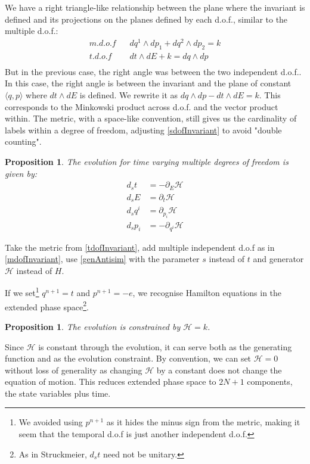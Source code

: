 \documentclass[aps,pra,10pt,twocolumn,floatfix,nofootinbib]{revtex4-1}
\newtheorem{prop}[thm]{Proposition}
\theoremstyle{definition}
\begin{document}
We have a right triangle-like relationship between the plane where the invariant is defined and its projections on the planes defined by each d.o.f., similar to the multiple d.o.f.:
\begin{align*}
m.d.o.f \;\;\; &dq^1 \wedge dp_1 + dq^2 \wedge dp_2 = k \\
t.d.o.f \;\;\; &dt \wedge dE + k = dq \wedge dp \\
\end{align*}
But in the previous case, the right angle was between the two independent d.o.f.. In this case, the right angle is between the invariant and the plane of constant $\langle q, p \rangle$ where $dt \wedge dE$ is defined. We rewrite it as $dq \wedge dp - dt \wedge dE = k$. This corresponds to the Minkowski product across d.o.f. and the vector product within. The metric, with a space-like convention, still gives us the cardinality of labels within a degree of freedom, adjusting \ref{sdofInvariant} to avoid "double counting".

\begin{prop}\label{tdofHam}
The evolution for time varying multiple degrees of freedom is given by:
\begin{align*}
d_{s}t &= - \partial_{E} \mathcal{H} \\
d_{s}E &= \partial_{t} \mathcal{H} \\
d_{s}q^i &= \partial_{p_i} \mathcal{H} \\
d_{s}p_i &= - \partial_{q^i} \mathcal{H}
\end{align*}
\end{prop}

Take the metric from \ref{tdofInvariant}, add multiple independent d.o.f as in \ref{mdofInvariant}, use \ref{genAntisim} with the parameter $s$ instead of $t$ and generator $\mathcal{H}$ instead of $H$.

If we set\footnote{We avoided using $p^{n+1}$ as it hides the minus sign from the metric, making it seem that the temporal d.o.f is just another independent d.o.f.} $q^{n+1}=t$ and $p^{n+1}=-e$, we recognise Hamilton equations in the extended phase space\footnote{As in Struckmeier\cite{Struckmeier}, $d_{s}t$ need not be unitary.}\cite{Synge,Lanczos}.

\begin{prop}\label{tdofConstrain}
The evolution is constrained by $\mathcal{H}=k$.
\end{prop}

Since $\mathcal{H}$ is constant through the evolution, it can serve both as the generating function and as the evolution constraint. By convention, we can set $\mathcal{H}=0$ without loss of generality as changing $\mathcal{H}$ by a constant does not change the equation of motion. This reduces extended phase space to $2N + 1$ components, the state variables plus time.
\end{document}
